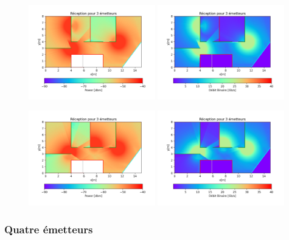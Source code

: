 \documentclass[sn-mathphys-num]{sn-jnl}%
\theoremstyle{thmstyleone}%
\theoremstyle{thmstyletwo}%
\theoremstyle{thmstylethree}%
\begin{document}
\begin{figure}[H]
    \centering
    \includegraphics[width=0.49\textwidth]{images/opti/3_2.png}
    \includegraphics[width=0.49\textwidth]{images/opti/3_2_bin.png}
\end{figure}

\begin{figure}[H]
    \centering
    \includegraphics[width=0.49\textwidth]{images/opti/3_3.png}
    \includegraphics[width=0.49\textwidth]{images/opti/3_3_bin.png}
\end{figure}

\subsubsection{Quatre émetteurs}
\label{sub-4}
\end{document}
